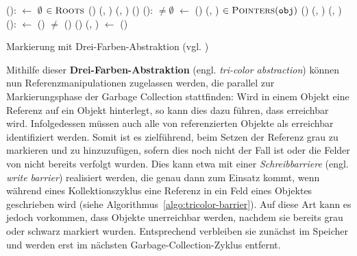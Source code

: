 \begin{algorithm}[h]
\begin{algorithmic}[1]
	\State {}():
	\State \quad {} $\gets$ $\emptyset$				
	\State \quad \FOREACH {} $\in \textsc{Roots}$
	\State \quad \quad \IF {}()
	\State \quad \quad \quad {}(, )	
	\State \quad \quad \quad {}(, )	
	\State \quad \quad \quad {}()
	\Statex
	\State {}():
	\State \quad \WHILE {} $\neq \emptyset$
	\State \quad \quad {} $\gets$ ()
	\State \quad \quad {}(, )		
	\State \quad \quad \FOREACH {} $\in \textsc{Pointers}(\texttt{obj})$
	\State \quad \quad \quad \IF {}()
	\State \quad \quad \quad \quad {}(, )	
	\State \quad \quad \quad \quad {}(, )
	\Statex
	\State {}():
	\State \quad {} $\gets$ ()
	\State \quad \WHILE {} $\neq$ \Null
	\State \quad \quad \IF {}()
	\State \quad \quad \quad {}()
	\State \quad \quad \ELSE {}(, )
	\State \quad \quad {} $\gets$ ()
\end{algorithmic}
\caption[Markierung mit Drei-Farben-Abstraktion]{Markierung mit Drei-Farben-Abstraktion (vgl. \cite[S. 970]{dijkstra1978})}
\label{algo:tricolor}
\end{algorithm}

Mithilfe dieser \textbf{Drei-Farben-Abstraktion} (engl. \textit{tri-color abstraction}) können nun Referenzmanipulationen zugelassen werden, die parallel zur Markierungsphase der Garbage Collection stattfinden:
Wird in einem Objekt  eine Referenz auf ein Objekt  hinterlegt, so kann dies dazu führen, dass  erreichbar wird.
Infolgedessen müssen auch alle von  referenzierten Objekte als erreichbar identifiziert werden.
Somit ist es zielführend,  beim Setzen der Referenz grau zu markieren und zu  hinzuzufügen, sofern dies noch nicht der Fall ist oder die Felder von  nicht bereits verfolgt wurden.
Dies kann etwa mit einer \textit{Schreibbarriere} (engl. \textit{write barrier}) realisiert werden, die genau dann zum Einsatz kommt, wenn während eines Kollektionszyklus eine Referenz in ein Feld eines Objektes geschrieben wird (siehe Algorithmus~\ref{algo:tricolor-barrier}).
Auf diese Art kann es jedoch vorkommen, dass Objekte unerreichbar werden, nachdem sie bereits grau oder schwarz markiert wurden.
Entsprechend verbleiben sie zunächst im Speicher und werden erst im nächsten Garbage-Collection-Zyklus entfernt.

